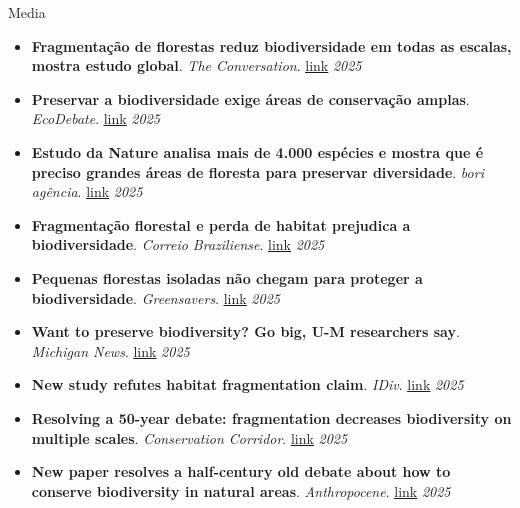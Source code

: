 \documentclass{resume}
\begin{document}
\begin{rSection}{Media}
\begin{itemize}
\item \textbf{Fragmentação de florestas reduz biodiversidade em todas as escalas, mostra estudo global}. \textit{The Conversation}. \href{https://theconversation.com/fragmentacao-de-florestas-reduz-biodiversidade-em-todas-as-escalas-mostra-estudo-global-252096}{\underline{link}} \hfill{\em 2025}
\item \textbf{Preservar a biodiversidade exige áreas de conservação amplas}. \textit{EcoDebate}. \href{https://www.ecodebate.com.br/2025/03/13/preservar-a-biodiversidade-exige-areas-de-conservacao-amplas}{\underline{link}} \hfill{\em 2025}
\item \textbf{Estudo da Nature analisa mais de 4.000 espécies e mostra que é preciso grandes áreas de floresta para preservar diversidade}. \textit{bori agência}. \href{https://abori.com.br/ambiente/nature-biodiversidade-um/}{\underline{link}} \hfill{\em 2025}
\item \textbf{Fragmentação florestal e perda de habitat prejudica a biodiversidade}. \textit{Correio Braziliense}. \href{https://www.correiobraziliense.com.br/ciencia-e-saude/2025/03/7082545-fragmentacao-florestal-e-perda-de-habitat-prejudica-a-biodiversidade.html}{\underline{link}} \hfill{\em 2025}
\item \textbf{Pequenas florestas isoladas não chegam para proteger a biodiversidade}. \textit{Greensavers}. \href{https://greensavers.sapo.pt/pequenas-florestas-isoladas-nao-chegam-para-proteger-a-biodiversidade/}{\underline{link}} \hfill{\em 2025}
\item \textbf{Want to preserve biodiversity? Go big, U-M researchers say}. \textit{Michigan News}. \href{https://news.umich.edu/want-to-preserve-biodiversity-go-big-u-m-researchers-say/}{\underline{link}} \hfill{\em 2025}
\item \textbf{New study refutes habitat fragmentation claim}. \textit{IDiv}. \href{https://www.idiv.de/new-study-refutes-habitat-fragmentation-claim}{\underline{link}} \hfill{\em 2025}
\item \textbf{Resolving a 50-year debate: fragmentation decreases biodiversity on multiple scales}. \textit{Conservation Corridor}. \href{https://conservationcorridor.org/digests/2025/03/resolving-a-50-year-debate-fragmentation-decreases-biodiversity-on-multiple-scales/}{\underline{link}} \hfill{\em 2025}
\item \textbf{New paper resolves a half-century old debate about how to conserve biodiversity in natural areas}. \textit{Anthropocene}. \href{https://www.anthropocenemagazine.org/2025/03/new-paper-resolves-a-half-century-old-debate-about-how-to-conserve-biodiversity-in-natural-areas/}{\underline{link}} \hfill{\em 2025}

\end{itemize}
\end{rSection}
\end{document}
